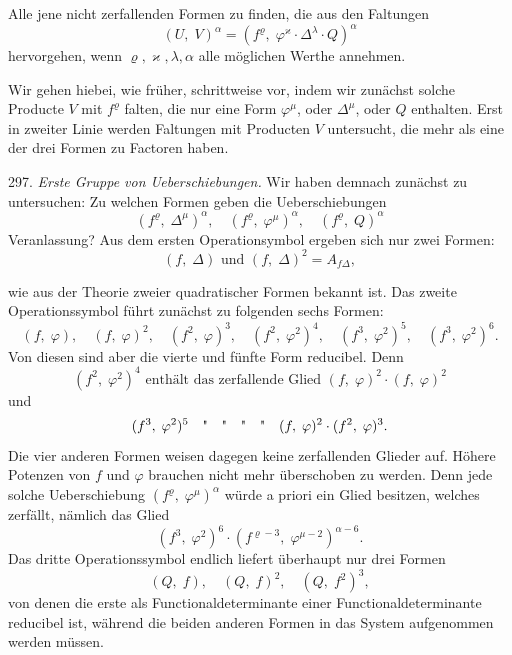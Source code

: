 \documentclass[11pt]{article}
\providecommand{\weberpage}[1]{}
\let\Delta\varDelta
\begin{document}
\glqq Alle jene nicht zerfallenden Formen zu finden, die aus den Faltungen
\[
(U, \; V)^\alpha = (f^\varrho, \; \varphi^\varkappa \cdot \Delta^\lambda \cdot Q)^\alpha
\]
hervorgehen, wenn $\varrho, \varkappa, \lambda, \alpha$ alle möglichen Werthe annehmen.\grqq{}

Wir gehen hiebei, wie früher, schrittweise vor, indem wir zunächst solche Producte $V$ mit $f^\varrho$ falten, die nur eine Form $\varphi^\mu$, oder $\Delta^\mu$, oder $Q$ enthalten. Erst in zweiter Linie werden Faltungen mit Producten $V$ untersucht, die mehr als eine der drei Formen zu Factoren haben.

297. \textit{Erste Gruppe von Ueberschiebungen.} Wir haben demnach zunächst zu untersuchen: Zu welchen Formen geben die Ueberschiebungen
\[
(f^\varrho, \; \Delta^\mu)^\alpha, \quad (f^\varrho, \; \varphi^\mu)^\alpha, \quad (f^\varrho, \; Q)^\alpha
\]
Veranlassung? Aus dem ersten Operationsymbol ergeben sich nur zwei Formen:
\[
(f, \; \Delta) \text{ und } (f, \; \Delta)^2 = A_{f\Delta},
\]


\weberpage{322}
wie aus der Theorie zweier quadratischer Formen bekannt ist. Das zweite Operationssymbol führt zunächst zu folgenden sechs Formen:
\[
(f, \; \varphi), \quad (f, \; \varphi)^2, \quad (f^2, \; \varphi)^3, \quad (f^2, \; \varphi^2)^4, \quad (f^3, \; \varphi^2)^5, \quad (f^3, \; \varphi^2)^6.
\]
Von diesen sind aber die vierte und fünfte Form reducibel. Denn
\[
(f^2, \; \varphi^2)^4 \text{ enthält das zerfallende Glied } (f, \; \varphi)^2 \cdot (f, \; \varphi)^2
\]
und
\[
(f^3, \; \varphi^2)^5 \quad \text{\textquotedbl} \quad \text{\textquotedbl} \quad \text{\textquotedbl} \quad \text{\textquotedbl} \quad (f, \; \varphi)^2 \cdot (f^2, \; \varphi)^3.
\]
Die vier anderen Formen weisen dagegen keine zerfallenden Glieder auf. Höhere Potenzen von $f$ und $\varphi$ brauchen nicht mehr überschoben zu werden. Denn jede solche Ueberschiebung $(f^\varrho, \; \varphi^\mu)^\alpha$ würde a priori ein Glied besitzen, welches zerfällt, nämlich das Glied
\[
(f^3, \; \varphi^2)^6 \cdot (f^{\varrho-3}, \; \varphi^{\mu-2})^{\alpha-6}.
\]
Das dritte Operationssymbol endlich liefert überhaupt nur drei Formen
\[
(Q, \; f), \quad (Q, \; f)^2, \quad (Q, \; f^2)^3,
\]
von denen die erste als Functionaldeterminante einer Functionaldeterminante reducibel ist, während die beiden anderen Formen in das System aufgenommen werden müssen.
\end{document}
